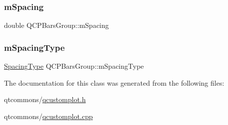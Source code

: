 \subsubsection{\texorpdfstring{mSpacing}{mSpacing}}
{\footnotesize\ttfamily double Q\+C\+P\+Bars\+Group\+::m\+Spacing\hspace{0.3cm}{\ttfamily [protected]}}

\mbox{\label{class_q_c_p_bars_group_a6794ee1a9c81864d627bff6a4b2d64ec}} 
\subsubsection{\texorpdfstring{mSpacingType}{mSpacingType}}
{\footnotesize\ttfamily \mbox{\hyperlink{class_q_c_p_bars_group_a4c0521120a97e60bbca37677a37075b6}{Spacing\+Type}} Q\+C\+P\+Bars\+Group\+::m\+Spacing\+Type\hspace{0.3cm}{\ttfamily [protected]}}



The documentation for this class was generated from the following files\+:\begin{DoxyCompactItemize}
\item 
qtcommons/\mbox{\hyperlink{qcustomplot_8h}{qcustomplot.\+h}}\item 
qtcommons/\mbox{\hyperlink{qcustomplot_8cpp}{qcustomplot.\+cpp}}\end{DoxyCompactItemize}
